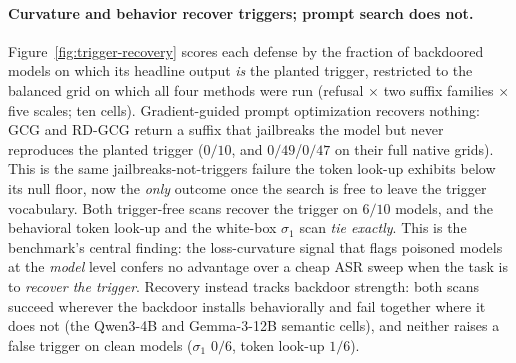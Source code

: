 \documentclass[letterpaper]{article} %
\begin{document}
\paragraph{Curvature and behavior recover triggers; prompt search does not.}
Figure~\ref{fig:trigger-recovery} scores each defense by the fraction of backdoored models on which its headline output \emph{is} the planted trigger, restricted to the balanced grid on which all four methods were run (refusal $\times$ two suffix families $\times$ five scales; ten cells).
Gradient-guided prompt optimization recovers nothing: GCG and RD-GCG return a suffix that jailbreaks the model but never reproduces the planted trigger ($0/10$, and $0/49$/$0/47$ on their full native grids). This is the same jailbreaks-not-triggers failure the token look-up exhibits below its null floor, now the \emph{only} outcome once the search is free to leave the trigger vocabulary.
Both trigger-free scans recover the trigger on $6/10$ models, and the behavioral token look-up and the white-box $\sigma_1$ scan \emph{tie exactly}.
This is the benchmark's central finding: the loss-curvature signal that flags poisoned models at the \emph{model} level \citep{keenan_mechanistic_2026} confers no advantage over a cheap ASR sweep when the task is to \emph{recover the trigger}. Recovery instead tracks backdoor strength: both scans succeed wherever the backdoor installs behaviorally and fail together where it does not (the Qwen3-4B and Gemma-3-12B semantic cells), and neither raises a false trigger on clean models ($\sigma_1$ $0/6$, token look-up $1/6$).
\end{document}

